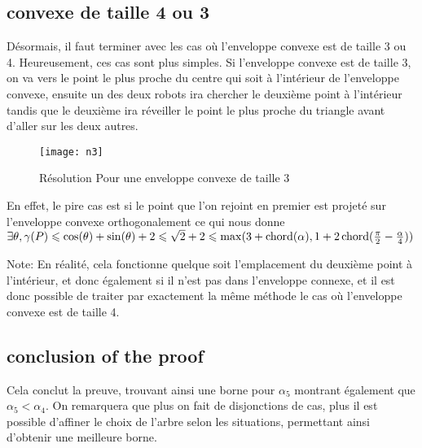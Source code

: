 \subsection{convexe de taille 4 ou 3}\label{conv3}

Désormais, il faut terminer avec les cas où l'enveloppe convexe est de taille 3 ou 4. Heureusement, ces cas sont plus simples.
Si l'enveloppe convexe est de taille 3, on va vers le point le plus proche du centre qui soit à l'intérieur de l'enveloppe convexe, ensuite un des deux robots ira chercher le deuxième point à l'intérieur tandis que le deuxième ira réveiller le point le plus proche du triangle avant d'aller sur les deux autres.

\begin{figure}[h!]
  \centering
  \texttt{[image: n3]}
  \caption{Résolution Pour une enveloppe convexe de taille 3}
  \label{fig:n3}
\end{figure}

En effet, le pire cas est si le point que l'on rejoint en premier est projeté sur l'enveloppe convexe orthogonalement ce qui nous donne $\exists \theta, \gamma(P) \leqslant \cos(\theta) + \sin(\theta) + 2 \leqslant \sqrt{2} + 2 \leqslant \max(3 + \operatorname{chord}(\alpha), 1 + 2\operatorname{chord}(\frac{\pi}{2} - \frac{\alpha}{4}))$

Note: En réalité, cela fonctionne quelque soit l'emplacement du deuxième point à l'intérieur, et donc également si il n'est pas dans l'enveloppe connexe, et il est donc possible de traiter par exactement la même méthode le cas où l'enveloppe convexe est de taille 4.

\subsection{conclusion of the proof}

Cela conclut la preuve, trouvant ainsi une borne pour $\alpha_5$ montrant également que $\alpha_5 < \alpha_4$. On remarquera que plus on fait de disjonctions de cas, plus il est possible d'affiner le choix de l'arbre selon les situations, permettant ainsi d'obtenir une meilleure borne.